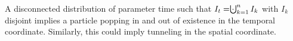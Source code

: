 \documentclass[twoside,a4paper,11pt]{article}
\numberwithin{equation}{section}
\begin{document}
A disconnected distribution of parameter time such that $I_t = \cdot \hspace{-7pt}\bigcup_{k=1}^n I_k $ with $I_k$ disjoint implies a particle popping in and out of existence in the temporal coordinate. Similarly, this could imply tunneling in the spatial coordinate.
\fi

\end{document}
